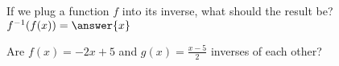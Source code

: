 \documentclass{ximera}
\author{David Kish}
\begin{document}
\begin{exercise}
If we plug a function $f$ into its inverse, what should the result be?\\
$f^{-1}(f(x))=\answer{x}$
\end{exercise}
\begin{exercise}
Are $f(x)=-2x+5$ and $g(x)=\frac{x-5}{2}$ inverses of each other?
\begin{multipleChoice}
\end{multipleChoice}
\end{exercise}
\end{document}
